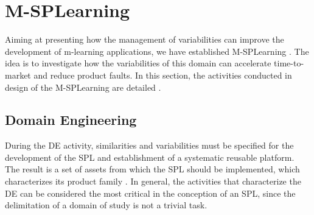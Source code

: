 \section{M-SPLear\allowbreak ning}\label{section3}

Aiming at presenting how the management of variabilities can improve the development of m-learning applications, we have established M-SPLear\allowbreak ning \cite{falvojr14a,falvojr14b}. The idea is to investigate how the variabilities of this domain can accelerate time-to-market and reduce product faults. In this section, the activities conducted in design of the M-SPLear\allowbreak ning are detailed \cite{oliveirajr10,filho13,krueger02,kang90}.

\subsection{Domain Engineering}\label{section31}

During the DE activity, similarities and variabilities must be specified for the development of the SPL and establishment of a systematic reusable platform. The result is a set of assets from which the SPL should be implemented, which characterizes its product family \cite{bockle05,vanderlinden07}. In general, the activities that characterize the DE can be considered the most critical in the conception of an SPL, since the delimitation of a domain of study is not a trivial task.

